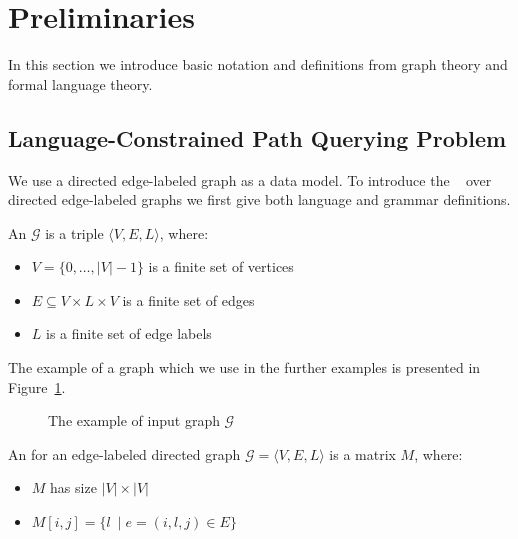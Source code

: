 \section{Preliminaries}

In this section we introduce basic notation and definitions from graph theory and formal language theory.

\subsection{Language-Constrained Path Querying Problem}

We use a directed edge-labeled graph as a data model. 
To introduce the ~\cite{barrett2000formal} over directed edge-labeled graphs we first give both language and grammar definitions.

\begin{definition}
An  $\mathcal{G}$ is a triple $\langle V,E,L \rangle$, where:
\begin{itemize}
    \item $V = \{0, \ldots, |V|-1\}$ is a finite set of vertices
    \item $E \subseteq V \times L \times V$ is a finite set of edges
    \item $L$ is a finite set of edge labels
\end{itemize}
\end{definition}

The example of a graph which we use in the further examples is presented in Figure~\ref{fig:example_input_graph}.

\begin{figure}[h]
    \centering        
    \caption{The example of input graph $\mathcal{G}$}
    \label{fig:example_input_graph}
\end{figure}

\begin{definition}
An  for an edge-labeled directed graph $\mathcal{G} = \langle V,E,L \rangle$ is a matrix $M$, where:
\begin{itemize}
    \item $M$ has size $|V|\times|V|$
    \item $M[i,j] = \{l~\mid e = (i,l,j) \in E\}$
\end{itemize}
\end{definition}

